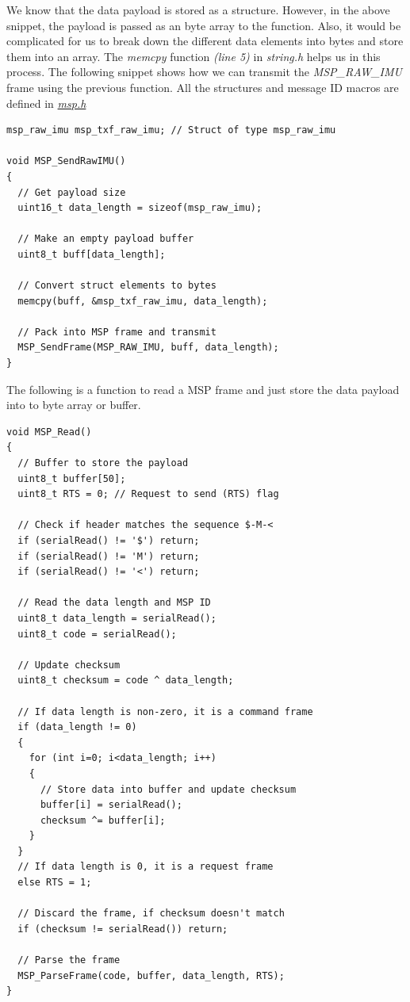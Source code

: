 \documentclass[a4paper,12pt,oneside]{book}
\begin{document}
\bigskip

We know that the data payload is stored as a structure. However, in the above snippet, the payload is passed as an byte array to the function. Also, it would be complicated for us to break down the different data elements into bytes and store them into an array. The \textit{memcpy} function \textit{(line 5)} in \textit{string.h} helps us in this process. The following snippet shows how we can transmit the \textit{MSP{\_}RAW{\_}IMU} frame using the previous function. All the structures and message ID macros are defined in \href{./code/msp.h}{\textit{msp.h}}\\

\begin{verbatim}
msp_raw_imu msp_txf_raw_imu; // Struct of type msp_raw_imu

void MSP_SendRawIMU()
{
  // Get payload size
  uint16_t data_length = sizeof(msp_raw_imu);				
  
  // Make an empty payload buffer
  uint8_t buff[data_length];	
  
  // Convert struct elements to bytes							
  memcpy(buff, &msp_txf_raw_imu, data_length);
  
  // Pack into MSP frame and transmit		
  MSP_SendFrame(MSP_RAW_IMU, buff, data_length);			
}
\end{verbatim}

The following is a function to read a MSP frame and just store the data payload into to byte array or buffer.\\

\begin{verbatim}
void MSP_Read()
{
  // Buffer to store the payload
  uint8_t buffer[50];
  uint8_t RTS = 0; // Request to send (RTS) flag

  // Check if header matches the sequence $-M-<
  if (serialRead() != '$') return;
  if (serialRead() != 'M') return;
  if (serialRead() != '<') return;
  
  // Read the data length and MSP ID
  uint8_t data_length = serialRead();
  uint8_t code = serialRead();
  
  // Update checksum
  uint8_t checksum = code ^ data_length;
  
  // If data length is non-zero, it is a command frame
  if (data_length != 0)
  {
    for (int i=0; i<data_length; i++)
    {
      // Store data into buffer and update checksum
      buffer[i] = serialRead();
      checksum ^= buffer[i];
    }
  } 
  // If data length is 0, it is a request frame
  else RTS = 1;
  
  // Discard the frame, if checksum doesn't match
  if (checksum != serialRead()) return;
  
  // Parse the frame
  MSP_ParseFrame(code, buffer, data_length, RTS);
}
\end{verbatim}
\end{document}
